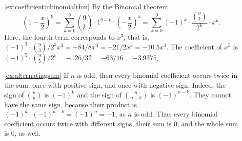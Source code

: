 \begin{enumerate}
\item[\ref{ex:coefficientinbinomialthm}]
By the Binomial theorem 
\[
\left( 1-\frac{x}{2} \right)^9 = \sum_{k=0}^9 \binom{9}{k} \cdot 1^{9-k} \cdot \left( - \frac{x}{2} \right)^k = \sum_{k=0}^9 \left( -1 \right)^k \cdot \frac{\binom{9}{k}}{2^k} \cdot x^k. 
\]
Here, the fourth term corresponds to $x^3$, that is, $\left( -1 \right)^3 \cdot \binom{9}{3}/2^3 x^3 = - 84/8 x^3 = -21/2 x^3 = -10.5 x^3$. 
The coefficient of $x^5$ is $\left( -1 \right)^5 \cdot \binom{9}{5}/2^5 = - 126/32  = -63/16 = -3.9375$. 

\item[\ref{ex:alternatingsum}]
If $n$ is odd, then every binomial coefficient occurs twice in the sum: once with positive sign, and once with negative sign. 
Indeed, the sign of $\binom{n}{k}$ is $(-1)^k$ and the sign of $\binom{n}{n-k}$ is $(-1)^{n-k}$. 
They cannot have the same sign, because their product is $(-1)^k \cdot (-1)^{n-k} = (-1)^n = -1$, as $n$ is odd. 
Thus every binomial coefficient occurs twice with different signs, their sum is 0, and the whole sum is 0, as well. 


\end{enumerate}
